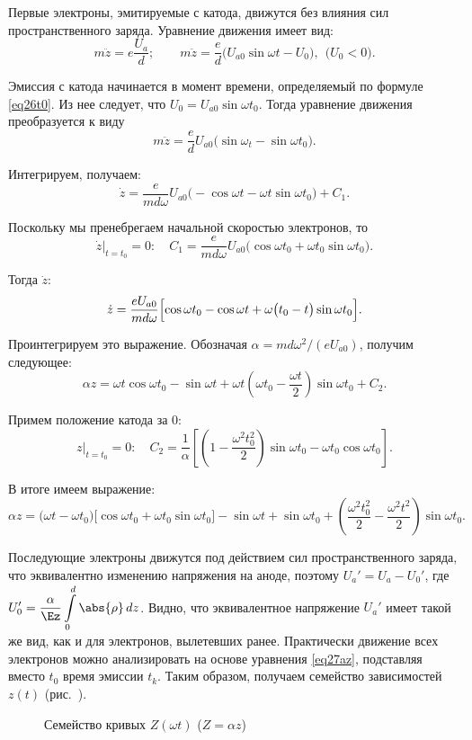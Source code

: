 
Первые электроны, эмитируемые с катода, движутся без влияния сил
пространственного заряда. Уравнение движения имеет вид:
\[
  m\ddot{z} = e\frac{U_a}{d}; \qquad
    m\ddot{z} = \frac{e}{d} \big( U_{a0}\sin\omega t - U_0 \big), \ \
    \big( U_0 < 0 \big).
\]

Эмиссия с катода начинается в момент времени, определяемый по формуле
\eqref{eq26t0}. Из нее следует, что \( U_0 = U_{a0}\sin\omega t_0 \). Тогда
уравнение движения преобразуется к виду
\[
  m\ddot{z} = \frac{e}{d}U_{a0} \bigl( \sin\omega_t - \sin\omega t_0 \big).
\]

Интегрируем, получаем:
\[
  \dot{z} = \frac{e}{md\omega}U_{a0} \big( -\cos\omega t -
    \omega t\sin\omega t_0 \big) + C_1.
\]

Поскольку мы пренебрегаем начальной скоростью электронов, то
\[
  \dot{z}\Big|_{t = t_0} = 0\colon \quad
    C_1 = \frac{e}{md\omega}U_{a0} \bigl(\cos\omega t_0 +
    \omega t_0\sin\omega t_0\big).
\]

Тогда \( \dot{z} \):
\[
  \dot{z} = \frac{eU_{a0}}{md\omega}\Bigl[ \cos\omega t_0 - \cos\omega t +
    \omega \big( t_0 - t \big) \sin\omega t_0 \Big].
\]

Проинтегрируем это выражение. Обозначая \( \alpha = md\omega^2 / (eU_{a0}) \),
получим следующее:
\[
  \alpha z = \omega t\cos\omega t_0 - \sin\omega t + \omega t \left( \omega t_0
    - \frac{\omega t}{2} \right) \sin\omega t_0 + C_2.
\]

Примем положение катода за 0:
\[
  z\Big|_{t = t_0} = 0\colon \quad
    C_2 = \frac{1}{\alpha} \left[ \left( 1 - \frac{\omega^2 t_0^2}{2} \right)
    \sin\omega t_0 - \omega t_0 \cos\omega t_0 \right].
\]

В итоге имеем выражение:
\begin{equation}
  \alpha z = \bigl( \omega t - \omega t_0 \big)\bigl[ \cos\omega t_0 +
    \omega t_0 \sin\omega t_0 \big] - \sin\omega t + \sin\omega t_0 + \left(
    \frac{\omega^2 t_0^2}{2} - \frac{\omega^2 t^2}{2} \right) \sin\omega t_0.
  \label{eq27az}
\end{equation}

Последующие электроны движутся под действием сил пространственного заряда, что
эквивалентно изменению напряжения на аноде, поэтому \( U_a' = U_a - U_0' \), где
\( \displaystyle
  U_0' = \frac{\alpha}{\Ez} \int\limits_0^d \abs{\rho}\,dz
\).
Видно, что эквивалентное напряжение \( U_a' \) имеет такой же вид, как и для
электронов, вылетевших ранее. Практически движение всех электронов можно
анализировать на основе уравнения \eqref{eq27az}, подставляя вместо \( t_0 \)
время эмиссии \( t_k \). Таким образом, получаем семейство зависимостей
\( z(t) \) (рис.~\pic{27Z(wt)}).
\begin{figure}[h!]
  \center
  \caption{Семейство кривых \( Z(\omega t) \) (\( Z = \alpha z \))}
  \label{pic27Z(wt)}
\end{figure}

